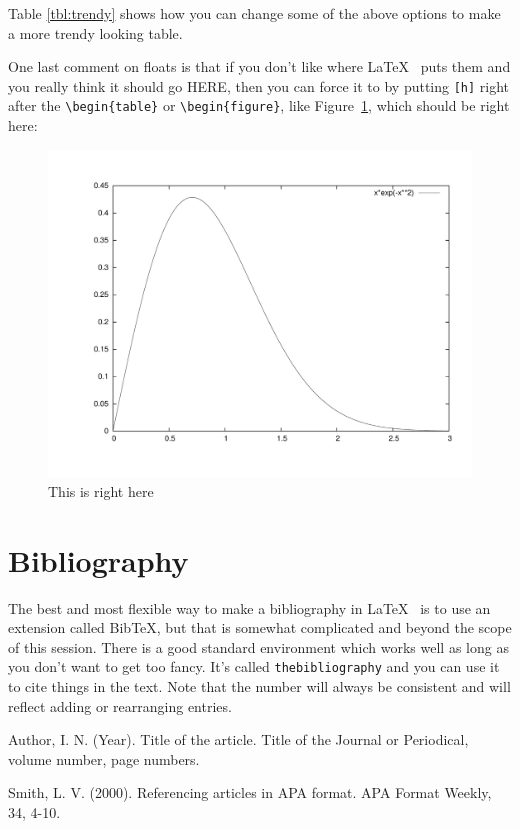 \documentclass[twocolumn,10 pt,showpacs,preprintnumbers,amsmath,amssymb]{revtex4-1}
\begin{document}
Table \ref{tbl:trendy} shows how you can change some of the above
options to make a more trendy looking table.

One last comment on floats is that if you don't like where \LaTeX~ puts
them and you really think it should go HERE, then you can force it to by
putting \texttt{[h]} right after the \verb_\begin{table}_ or
\verb_\begin{figure}_, like Figure~\ref{fig:here}, which should be right
here:
\begin{figure}[h]
    \centering
    \includegraphics[scale=0.25,angle=-90]{graph.pdf}
    \caption{This is right here}
    \label{fig:here}
\end{figure}

\section{Bibliography}

The best and most flexible way to make a bibliography in \LaTeX~ is to use
an extension called Bib\TeX, but that is somewhat complicated and beyond
the scope of this session. There is a good standard environment which
works well as long as you don't want to get too fancy. It's called
\texttt{thebibliography} and you can use it to cite things in the
text\cite{smith}. Note that the number will always be consistent and
will reflect adding or rearranging entries\cite{author}.

\begin{thebibliography}{99}

 Author, I. N. (Year). Title of the article. Title of the Journal or Periodical, volume number, page numbers.

 Smith, L. V. (2000). Referencing articles in APA format. APA Format Weekly, 34, 4-10.

\end{thebibliography}
\end{document}
